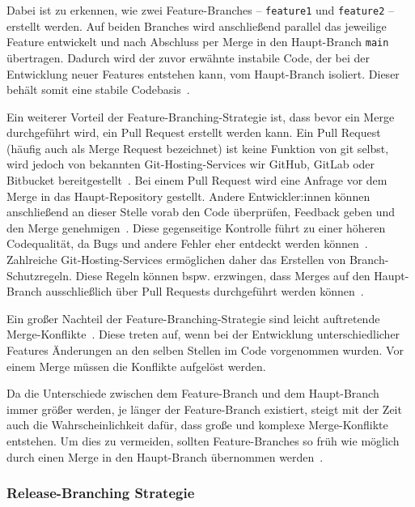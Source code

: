 Dabei ist zu erkennen, wie zwei Feature\hyp Branches -- \texttt{feature1} und \texttt{feature2} -- erstellt werden. Auf beiden Branches wird anschließend parallel das jeweilige Feature entwickelt und nach Abschluss per Merge in den Haupt\hyp Branch \texttt{main} übertragen.
Dadurch wird der zuvor erwähnte instabile Code, der bei der Entwicklung neuer Features entstehen kann, vom Haupt\hyp Branch isoliert. Dieser behält somit eine stabile Codebasis~\cite{sorin_dumitrescu_what_2021}.

Ein weiterer Vorteil der Feature\hyp Branching\hyp Strategie ist, dass bevor ein Merge durchgeführt wird, ein Pull Request erstellt werden kann. Ein Pull Request (häufig auch als Merge Request bezeichnet) ist keine Funktion von git selbst, wird jedoch von bekannten Git\hyp Hosting\hyp Services wir GitHub, GitLab oder Bitbucket bereitgestellt~\cite{heddings_what_2021}. Bei einem Pull Request wird eine Anfrage vor dem Merge in das Haupt\hyp Repository gestellt. Andere Entwickler:innen können anschließend an dieser Stelle vorab den Code überprüfen, Feedback geben und den Merge genehmigen~\cite{atlassian_feature_2023}. Diese gegenseitige Kontrolle führt zu einer höheren Codequalität, da Bugs und andere Fehler eher entdeckt werden können~\cite{pullrequest_why_2023}. Zahlreiche Git\hyp Hosting\hyp Services ermöglichen daher das Erstellen von Branch\hyp Schutzregeln. Diese Regeln können bspw. erzwingen, dass Merges auf den Haupt\hyp Branch ausschließlich über Pull Requests durchgeführt werden können~\cite{benvegnu_best_2020}.

Ein großer Nachteil der Feature\hyp Branching\hyp Strategie sind leicht auftretende Merge\hyp Konflikte~\cite{sorin_dumitrescu_what_2021}. Diese treten auf, wenn bei der Entwicklung unterschiedlicher Features Änderungen an den selben Stellen im Code vorgenommen wurden. Vor einem Merge müssen die Konflikte aufgelöst werden.

Da die Unterschiede zwischen dem Feature\hyp Branch und dem Haupt\hyp Branch immer größer werden, je länger der Feature\hyp Branch existiert, steigt mit der Zeit auch die Wahrscheinlichkeit dafür, dass große und komplexe Merge\hyp Konflikte entstehen. Um dies zu vermeiden, sollten Feature\hyp Branches so früh wie möglich durch einen Merge in den Haupt\hyp Branch übernommen werden~\cite{sorin_dumitrescu_what_2021}.


\subsubsection{Release\hyp Branching Strategie}


